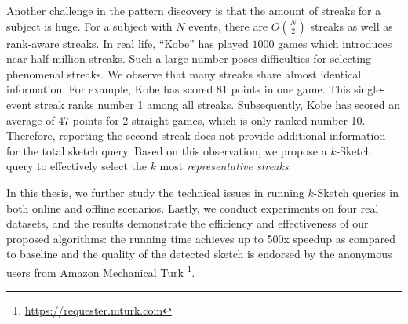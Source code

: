 

Another challenge in the pattern discovery is that the amount of streaks
for a subject is huge. For a subject with $N$ events,
there are $O{N\choose 2}$ streaks as well as rank-aware streaks. 
In real life, ``Kobe'' has played $1000$ games which introduces near half million streaks.
Such a large number poses difficulties for selecting phenomenal streaks. 
We observe that many streaks share almost identical information. For example, Kobe has scored 81 points
in one game. This single-event streak ranks number 1 among all streaks. Subsequently, Kobe has
scored an average of 47 points for 2 straight games, which is only ranked number 10. Therefore, reporting
the second streak does not provide additional information for the total sketch query.
Based on this observation, we
propose a $k$-Sketch query to effectively select the $k$ most \emph{representative streaks}.
%

In this thesis, we further study
the technical issues in running $k$-Sketch queries in both online and offline scenarios.
%
%
Lastly, we conduct experiments on four real
datasets, and the results demonstrate the efficiency and 
effectiveness of our proposed algorithms: the running time
achieves up to 500x speedup as compared to baseline and the quality of the
detected sketch is endorsed by the anonymous users
from Amazon Mechanical Turk \footnote{\url{https://requester.mturk.com}}.

